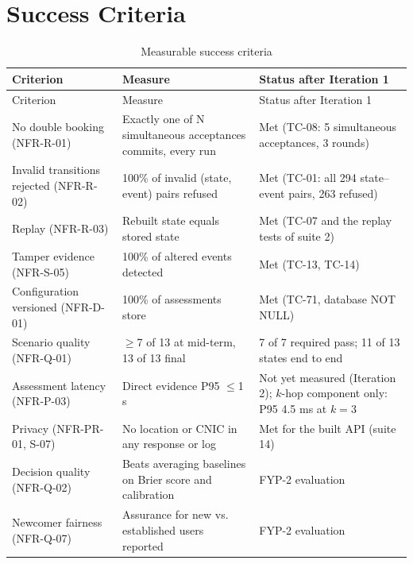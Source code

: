 \section{Success Criteria}\label{sec:success-criteria}
\begingroup
\begin{longtable}{@{}L{124pt}L{149pt}L{98pt}@{}}
\caption{Measurable success criteria}\label{tab:measurable-success-criteria}\\
\toprule
Criterion & Measure & Status after Iteration 1 \\
\midrule
\endfirsthead
\toprule
Criterion & Measure & Status after Iteration 1 \\
\midrule
\endhead
\bottomrule
\endlastfoot
No double booking (NFR-R-01) & Exactly one of N simultaneous acceptances commits, every run & Met (TC-08: 5 simultaneous acceptances, 3 rounds) \\
Invalid transitions rejected (NFR-R-02) & 100\% of invalid (state, event) pairs refused & Met (TC-01: all 294 state--event pairs, 263 refused) \\
Replay (NFR-R-03) & Rebuilt state equals stored state & Met (TC-07 and the replay tests of suite 2) \\
Tamper evidence (NFR-S-05) & 100\% of altered events detected & Met (TC-13, TC-14) \\
Configuration versioned (NFR-D-01) & 100\% of assessments store  & Met (TC-71, database NOT NULL) \\
Scenario quality (NFR-Q-01) & $\geq$7 of 13 at mid-term, 13 of 13 final & 7 of 7 required pass; 11 of 13 states end to end \\
Assessment latency (NFR-P-03) & Direct evidence P95 $\leq$1 s & Not yet measured (Iteration 2); $k$-hop component only: P95 4.5 ms at $k=3$ \\
Privacy (NFR-PR-01, S-07) & No location or CNIC in any response or log & Met for the built API (suite 14) \\
Decision quality (NFR-Q-02) & Beats averaging baselines on Brier score and calibration & FYP-2 evaluation \\
Newcomer fairness (NFR-Q-07) & Assurance for new vs. established users reported & FYP-2 evaluation \\
\end{longtable}
\endgroup
